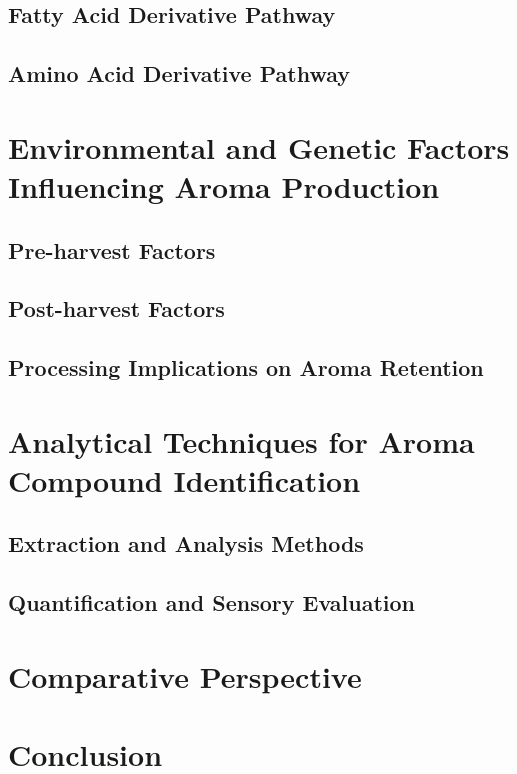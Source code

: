\subsection{Fatty Acid Derivative Pathway}
\subsection{Amino Acid Derivative Pathway}


\section{Environmental and Genetic Factors Influencing Aroma Production}
\subsection{Pre-harvest Factors}
\subsection{Post-harvest Factors}
\subsection{Processing Implications on Aroma Retention}


\section{Analytical Techniques for Aroma Compound Identification}
\subsection{Extraction and Analysis Methods}
\subsection{Quantification and Sensory Evaluation}

\section{Comparative Perspective}

\section{Conclusion}
